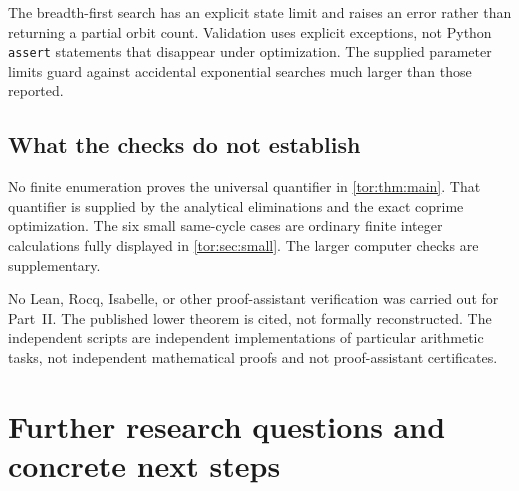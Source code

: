 \documentclass[11pt,a4paper]{article}
\numberwithin{equation}{section}
\theoremstyle{definition}
\theoremstyle{remark}
\begin{document}
The breadth-first search has an explicit state limit and raises an error
rather than returning a partial orbit count. Validation uses explicit
exceptions, not Python \texttt{assert} statements that disappear under
optimization. The supplied parameter limits guard against accidental
exponential searches much larger than those reported.

\subsection{What the checks do not establish}

No finite enumeration proves the universal quantifier in \cref{tor:thm:main}.
That quantifier is supplied by the analytical eliminations and the exact
coprime optimization. The six small same-cycle cases are ordinary finite
integer calculations fully displayed in \cref{tor:sec:small}. The larger
computer checks are supplementary.

No Lean, Rocq, Isabelle, or other proof-assistant verification was carried out
for Part~II. The published lower theorem is cited, not formally reconstructed.
The independent scripts are independent implementations of particular
arithmetic tasks, not independent mathematical proofs and not proof-assistant
certificates.

\section{Further research questions and concrete next steps}\label{tor:sec:questions}
\end{document}
